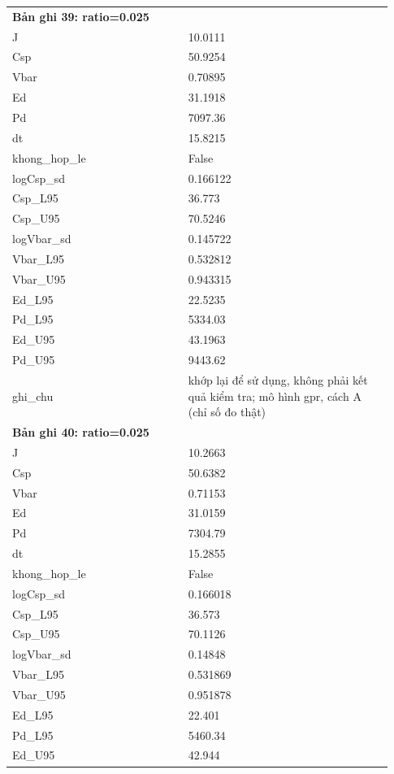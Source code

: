\begin{longtable}{p{0.43\linewidth}p{0.50\linewidth}}
\midrule
\multicolumn{2}{p{0.95\linewidth}}{\textbf{Bản ghi 39: ratio=0.025}} \\
J & 10.0111 \\
Csp & 50.9254 \\
Vbar & 0.70895 \\
Ed & 31.1918 \\
Pd & 7097.36 \\
dt & 15.8215 \\
khong\_\allowbreak hop\_\allowbreak le & False \\
logCsp\_\allowbreak sd & 0.166122 \\
Csp\_\allowbreak L95 & 36.773 \\
Csp\_\allowbreak U95 & 70.5246 \\
logVbar\_\allowbreak sd & 0.145722 \\
Vbar\_\allowbreak L95 & 0.532812 \\
Vbar\_\allowbreak U95 & 0.943315 \\
Ed\_\allowbreak L95 & 22.5235 \\
Pd\_\allowbreak L95 & 5334.03 \\
Ed\_\allowbreak U95 & 43.1963 \\
Pd\_\allowbreak U95 & 9443.62 \\
ghi\_\allowbreak chu & khớp lại để sử dụng, không phải kết quả kiểm tra; mô hình gpr, cách A (chỉ số đo thật) \\
\midrule
\multicolumn{2}{p{0.95\linewidth}}{\textbf{Bản ghi 40: ratio=0.025}} \\
J & 10.2663 \\
Csp & 50.6382 \\
Vbar & 0.71153 \\
Ed & 31.0159 \\
Pd & 7304.79 \\
dt & 15.2855 \\
khong\_\allowbreak hop\_\allowbreak le & False \\
logCsp\_\allowbreak sd & 0.166018 \\
Csp\_\allowbreak L95 & 36.573 \\
Csp\_\allowbreak U95 & 70.1126 \\
logVbar\_\allowbreak sd & 0.14848 \\
Vbar\_\allowbreak L95 & 0.531869 \\
Vbar\_\allowbreak U95 & 0.951878 \\
Ed\_\allowbreak L95 & 22.401 \\
Pd\_\allowbreak L95 & 5460.34 \\
Ed\_\allowbreak U95 & 42.944 \\

\end{longtable}
